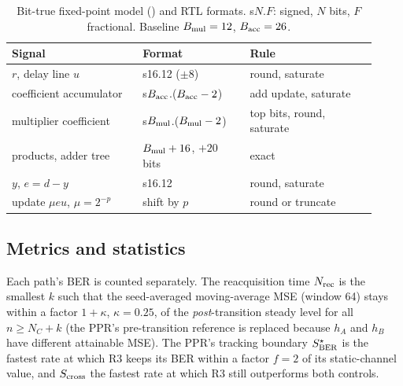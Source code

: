 \begin{table}[t]
\centering\small
\caption{Bit-true fixed-point model () and RTL formats. s$N$.$F$: signed, $N$ bits, $F$ fractional. Baseline $B_{\rm mul}=12$, $B_{\rm acc}=26$.}
\label{tab:formats}
\setlength{\tabcolsep}{3pt}
\begin{tabular}{@{}p{0.33\linewidth}p{0.27\linewidth}p{0.32\linewidth}@{}}
\toprule
Signal & Format & Rule\\
\midrule
$r$, delay line $u$ & s16.12 ($\pm8$) & round, saturate\\
coefficient accumulator & s$B_{\rm acc}$.($B_{\rm acc}-2$) & add update, saturate\\
multiplier coefficient & s$B_{\rm mul}$.($B_{\rm mul}-2$) & top bits, round, saturate\\
products, adder tree & $B_{\rm mul}+16$, $+20$ bits & exact\\
$y$, $e=d-y$ & s16.12 & round, saturate\\
update $\mu e u$, $\mu=2^{-p}$ & shift by $p$ & round or truncate\\
\bottomrule
\end{tabular}
\par\smallskip\footnotesize
{}
\end{table}

\subsection{Metrics and statistics}
\label{sec:metrics}
Each path's BER is counted separately. The reacquisition time $N_{\rm rec}$ is the smallest $k$ such that the seed-averaged moving-average MSE (window 64) stays within a factor $1+\kappa$, $\kappa=0.25$, of the \emph{post}-transition steady level for all $n\ge N_C+k$ (the PPR's pre-transition reference is replaced because $h_A$ and $h_B$ have different attainable MSE). The PPR's tracking boundary $S^\star_{\rm BER}$ is the fastest rate at which R3 keeps its BER within a factor $f=2$ of its static-channel value, and $S_{\rm cross}$ the fastest rate at which R3 still outperforms both controls.


